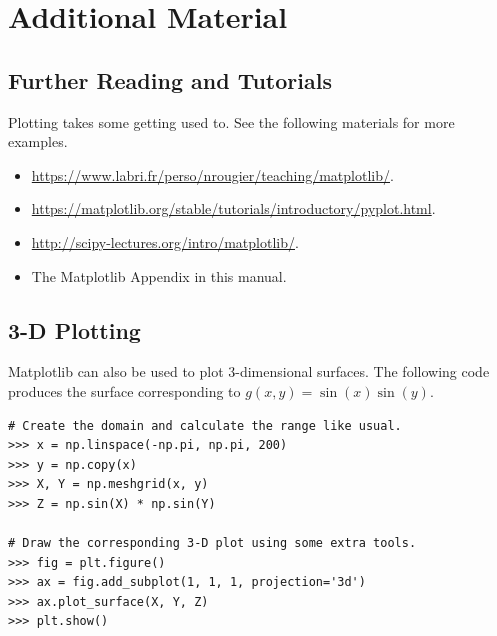 \newpage

\section*{Additional Material} %

\subsection*{Further Reading and Tutorials} %

Plotting takes some getting used to.
See the following materials for more examples.
\begin{itemize}
    \item \url{https://www.labri.fr/perso/nrougier/teaching/matplotlib/}.
    \item \url{https://matplotlib.org/stable/tutorials/introductory/pyplot.html}.
    \item \url{http://scipy-lectures.org/intro/matplotlib/}.
    \item The Matplotlib Appendix in this manual.
\end{itemize}

\subsection*{3-D Plotting} %

Matplotlib can also be used to plot 3-dimensional surfaces.
The following code produces the surface corresponding to $g(x,y) = \sin(x)\sin(y)$.

\begin{lstlisting}
# Create the domain and calculate the range like usual.
>>> x = np.linspace(-np.pi, np.pi, 200)
>>> y = np.copy(x)
>>> X, Y = np.meshgrid(x, y)
>>> Z = np.sin(X) * np.sin(Y)

# Draw the corresponding 3-D plot using some extra tools.
>>> fig = plt.figure()
>>> ax = fig.add_subplot(1, 1, 1, projection='3d')
>>> ax.plot_surface(X, Y, Z)
>>> plt.show()
\end{lstlisting}

